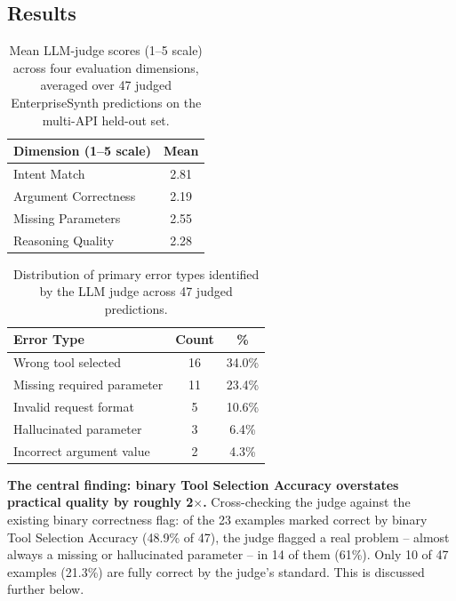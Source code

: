 \documentclass[11pt]{article}
\begin{document}
\subsection{Results}

\begin{table}[htbp]
\centering
\footnotesize
\setlength{\tabcolsep}{2pt}
\caption{Mean LLM-judge scores (1--5 scale) across four evaluation dimensions, averaged over 47
judged EnterpriseSynth predictions on the multi-API held-out set.}
\label{tab:judge-dimensions}
\begin{tabular}{lc}
\toprule
\textbf{Dimension (1--5 scale)} & \textbf{Mean} \\
\midrule
Intent Match & 2.81 \\
Argument Correctness & 2.19 \\
Missing Parameters & 2.55 \\
Reasoning Quality & 2.28 \\
\bottomrule
\end{tabular}
\end{table}

\begin{table}[htbp]
\centering
\footnotesize
\setlength{\tabcolsep}{2pt}
\caption{Distribution of primary error types identified by the LLM judge across 47 judged
predictions.}
\label{tab:judge-error-types}
\begin{tabular}{lcc}
\toprule
\textbf{Error Type} & \textbf{Count} & \textbf{\%} \\
\midrule
Wrong tool selected & 16 & 34.0\% \\
Missing required parameter & 11 & 23.4\% \\
Invalid request format & 5 & 10.6\% \\
Hallucinated parameter & 3 & 6.4\% \\
Incorrect argument value & 2 & 4.3\% \\
\bottomrule
\end{tabular}
\end{table}

\textbf{The central finding: binary Tool Selection Accuracy overstates practical quality by
roughly 2$\times$.} Cross-checking the judge against the existing binary correctness flag: of the
23 examples marked correct by binary Tool Selection Accuracy (48.9\% of 47), the judge flagged a
real problem -- almost always a missing or hallucinated parameter -- in 14 of them (61\%). Only
10 of 47 examples (21.3\%) are fully correct by the judge's standard. This is discussed further
below.
\end{document}
